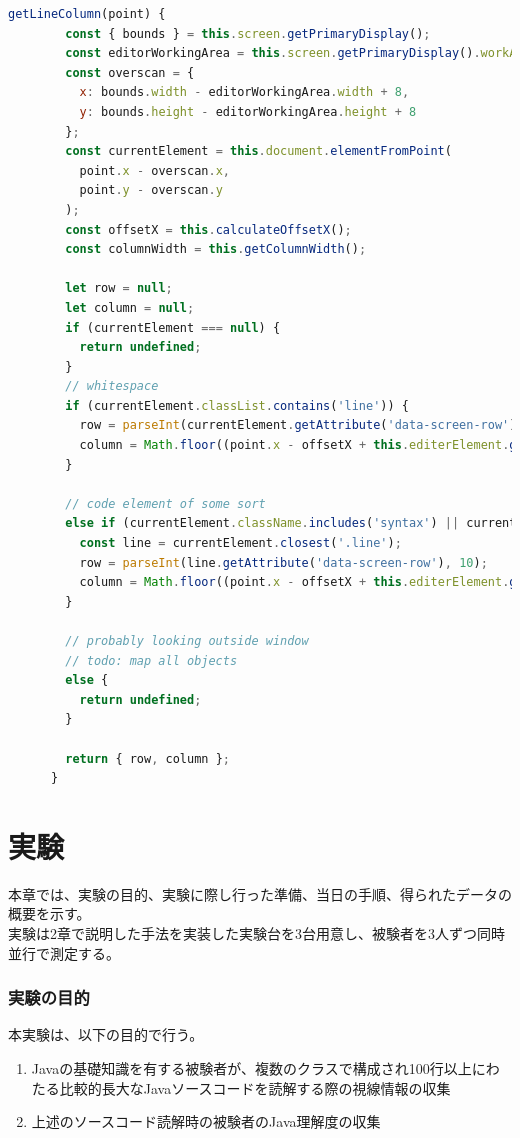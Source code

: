 \documentclass[paper=a4paper,fontsize=11pt]{jlreq}
\begin{document}
    \begin{lstlisting}[language=JavaScript, caption=getLineColumn関数のソースコード, label=getLineColumn]
      getLineColumn(point) {
        const { bounds } = this.screen.getPrimaryDisplay();
        const editorWorkingArea = this.screen.getPrimaryDisplay().workAreaSize;
        const overscan = {
          x: bounds.width - editorWorkingArea.width + 8,
          y: bounds.height - editorWorkingArea.height + 8
        };
        const currentElement = this.document.elementFromPoint(
          point.x - overscan.x,
          point.y - overscan.y
        );
        const offsetX = this.calculateOffsetX();
        const columnWidth = this.getColumnWidth();

        let row = null;
        let column = null;
        if (currentElement === null) {
          return undefined;
        }
        // whitespace
        if (currentElement.classList.contains('line')) {
          row = parseInt(currentElement.getAttribute('data-screen-row'), 10);
          column = Math.floor((point.x - offsetX + this.editerElement.getScrollLeft()) / columnWidth);
        }

        // code element of some sort
        else if (currentElement.className.includes('syntax') || currentElement.className.includes('leading-whitespace')) {
          const line = currentElement.closest('.line');
          row = parseInt(line.getAttribute('data-screen-row'), 10);
          column = Math.floor((point.x - offsetX + this.editerElement.getScrollLeft()) / columnWidth);
        }

        // probably looking outside window
        // todo: map all objects
        else {
          return undefined;
        }

        return { row, column };
      }
    \end{lstlisting}
    
    \pagebreak

\part{実験}
  本章では、実験の目的、実験に際し行った準備、当日の手順、得られたデータの概要を示す。\\
  実験は2章で説明した手法を実装した実験台を3台用意し、被験者を3人ずつ同時並行で測定する。

  \section{実験の目的}
    本実験は、以下の目的で行う。
    \begin{enumerate}
      \item Javaの基礎知識を有する被験者が、複数のクラスで構成され100行以上にわたる比較的長大なJavaソースコードを読解する際の視線情報の収集
      \item 上述のソースコード読解時の被験者のJava理解度の収集
    \end{enumerate}
\end{document}
